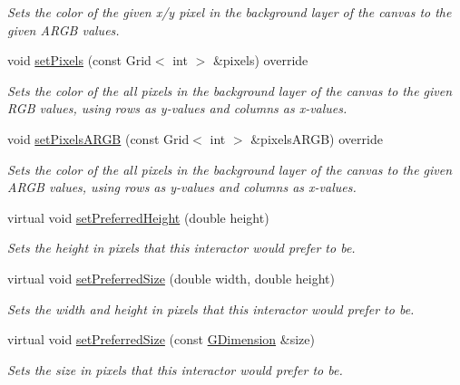\begin{DoxyCompactItemize}
\begin{DoxyCompactList}\small\item\em Sets the color of the given x/y pixel in the background layer of the canvas to the given A\+R\+GB values. \end{DoxyCompactList}\item 
void \mbox{\hyperlink{classGCanvas_ad151c93e985bb28b4f1207496c3ed024}{set\+Pixels}} (const Grid$<$ int $>$ \&pixels) override
\begin{DoxyCompactList}\small\item\em Sets the color of the all pixels in the background layer of the canvas to the given R\+GB values, using rows as y-\/values and columns as x-\/values. \end{DoxyCompactList}\item 
void \mbox{\hyperlink{classGCanvas_a6573789f75baf0b21122763e9a87c8df}{set\+Pixels\+A\+R\+GB}} (const Grid$<$ int $>$ \&pixels\+A\+R\+GB) override
\begin{DoxyCompactList}\small\item\em Sets the color of the all pixels in the background layer of the canvas to the given A\+R\+GB values, using rows as y-\/values and columns as x-\/values. \end{DoxyCompactList}\item 
virtual void \mbox{\hyperlink{classGInteractor_a1ab987704fce32098706c6f00fb08218}{set\+Preferred\+Height}} (double height)
\begin{DoxyCompactList}\small\item\em Sets the height in pixels that this interactor would prefer to be. \end{DoxyCompactList}\item 
virtual void \mbox{\hyperlink{classGInteractor_a042c5ae19430d765ef552371cae3632c}{set\+Preferred\+Size}} (double width, double height)
\begin{DoxyCompactList}\small\item\em Sets the width and height in pixels that this interactor would prefer to be. \end{DoxyCompactList}\item 
virtual void \mbox{\hyperlink{classGInteractor_aa22d9be4bc0e078bb0ea69b0fc9d7c75}{set\+Preferred\+Size}} (const \mbox{\hyperlink{structGDimension}{G\+Dimension}} \&size)
\begin{DoxyCompactList}\small\item\em Sets the size in pixels that this interactor would prefer to be. \end{DoxyCompactList}\item 

\end{DoxyCompactItemize}
